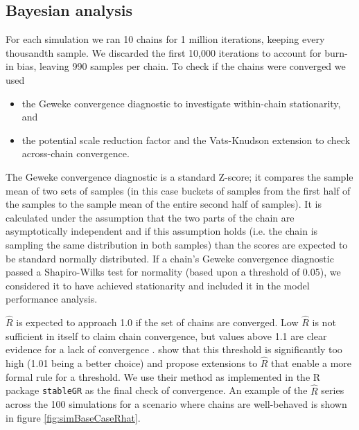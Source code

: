 \documentclass[]{article}
\begin{document}
\subsection{Bayesian analysis} \label{sec:simBayesianAnalysis}
For each simulation we ran 10 chains for 1 million iterations, keeping every thousandth sample. We discarded the first 10,000 iterations to account for burn-in bias, leaving 990 samples per chain. To check if the chains were converged we used
\begin{itemize}
	\item the Geweke convergence diagnostic \citep{geweke1991evaluating} to investigate within-chain stationarity, and
	\item the potential scale reduction factor \citep[$\hat{R}$, ][]{gelman1992inference} and the Vats-Knudson extension \citep[\emph{stable $\hat{R}$},][]{vats2018revisiting} to check across-chain convergence.
\end{itemize}
The Geweke convergence diagnostic is a standard Z-score; it compares the sample mean of two sets of samples (in this case buckets of samples from the first half of the samples to the sample mean of the entire second half of samples). It is calculated under the assumption that the two parts of the chain are asymptotically independent and if this assumption holds (i.e. the chain is sampling the same distribution in both samples) than the scores are expected to be standard normally distributed. If a chain's Geweke convergence diagnostic passed a Shapiro-Wilks test for normality \citep{shapiro1965analysis} (based upon a threshold of 0.05), we considered it to have achieved stationarity and included it in the model performance analysis. 

$\hat{R}$ is expected to approach 1.0 if the set of chains are converged. Low $\hat{R}$ is not sufficient in itself to claim chain convergence, but values above 1.1 are clear evidence for a lack of convergence \citep{gelman2013bayesian}. \cite{vats2018revisiting} show that this threshold is significantly too high (1.01 being a better choice) and propose extensions to $\hat{R}$ that enable a more formal rule for a threshold. We use their method as implemented in the R package \texttt{stableGR} \citep{knudson20202stableGR} as the final check of convergence. An example of the $\hat{R}$ series across the 100 simulations for a scenario where chains are well-behaved is shown in figure \ref{fig:simBaseCaseRhat}.
\end{document}
